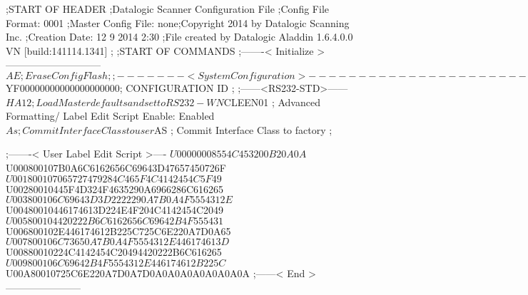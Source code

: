 ;START OF HEADER
;Datalogic Scanner Configuration File
;Config File Format: 0001
;Master Config File: none;Copyright 2014 by Datalogic Scanning Inc.
;Creation Date: 12 9 2014 2:30
;File created by Datalogic Aladdin 1.6.4.0.0 VN [build:141114.1341]
;
;START OF COMMANDS
;-------< Initialize >-----------------------------
$AE                 ; Erase Config Flash
;
;-------< System Configuration >-------------------------------
$YF00000000000000000000; CONFIGURATION ID
;
;------<RS232-STD>------
$HA12               ; Load Master defaults and set to RS232-WN
$CLEEN01            ; Advanced Formatting/ Label Edit Script Enable: Enabled
$As                 ; Commit Interface Class to user
$AS                 ; Commit Interface Class to factory
;

;-------< User Label Edit Script >----
$U00000008554C453200B20A0A
$U000800107B0A6C6162656C69643D47657450726F
$U001800107065727479284C465F4C4142454C5F49
$U00280010445F4D324F4635290A6966286C616265
$U003800106C69643D3D2222290A7B0A4F5554312E
$U00480010446174613D224E4F204C4142454C2049
$U005800104420222B6C6162656C69642B4F555431
$U006800102E446174612B225C725C6E220A7D0A65
$U007800106C73650A7B0A4F5554312E446174613D
$U00880010224C4142454C20494420222B6C616265
$U009800106C69642B4F5554312E446174612B225C
$U00A80010725C6E220A7D0A7D0A0A0A0A0A0A0A0A
;------< End >-----------------------
